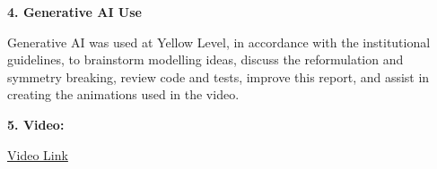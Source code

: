 \documentclass[a4paper,9pt]{article}
\begin{document}
\textbf{4. Generative AI Use}

Generative AI was used at Yellow Level, in accordance with the institutional guidelines, to brainstorm modelling ideas, discuss the reformulation and symmetry breaking, review code and tests, improve this report, and assist in creating the animations used in the video.

\textbf{5. Video:}

\href{https://drive.google.com/file/d/1Hvkizfahr0AuHp_vQKwxohsUTWWBTaUO/view?usp=sharing} {Video Link}
\end{document}
